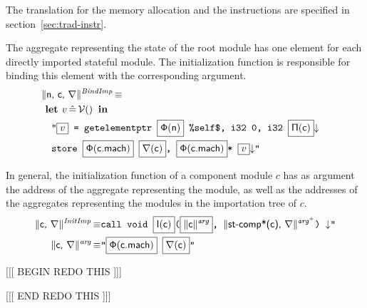 \documentclass{llncs}
\newcommand{\trad}[2]{\ensuremath{\lVert \textsf{#1} \rVert^{\textit{#2}}}}
\newcommand{\nl}[0]{\ensuremath{\downarrow}}
\DeclareMathOperator{\isdef}{\equiv}
\DeclareMathOperator{\variable}{\mathcal{V}()}
\newcommand{\llvm}[1]{\texttt{#1}}
\newcommand{\B}[1]{\textsf{#1}}
\newcommand{\ListOf}[1]{$\mbox{#1}^+$}
\newcommand{\LET}[0]{\textbf{ let }}
\DeclareMathOperator{\BE}{\hat{=}}
\newcommand{\IN}[0]{\textbf{ in }}
\newcommand{\PH}[1]{\framebox{$#1$}}
\newcommand{\idx}[0]{\ensuremath{\sf\Pi}}
\newcommand{\stateref}[0]{\ensuremath{\sf\Phi}}
\newcommand{\self}[0]{\llvm{\%self\$}}
\newcommand{\init}[0]{\ensuremath{\mathsf{I}}}
\begin{document}
The translation for the memory allocation and the instructions are specified in
section~\ref{sec:trad-instr}.  

The aggregate representing the state of the root module has one element for
each directly imported stateful module. The initialization function is
responsible for binding this element with the corresponding argument.
\begin{align*}
  \lefteqn{\trad{\B{n}, \B{c}, \argname}{BindImp} \isdef} \\
  & \LET v \BE \variable \IN \\
  & \quad \llvm{"\PH{v} = getelementptr \PH{\stateref(\B{n})} \self, i32 0, i32 \PH{\idx(\B{c})}\nl}\\
  & \quad \llvm{store \PH{\stateref(\B{c.mach})} \PH{\argname(\B{c})}, 
    \PH{\stateref(\B{c.mach})}* \PH{v}\nl"}
\end{align*}


In general, the initialization function of a component module $c$ has as
argument the address of the aggregate representing the module, as well as the
addresses of the aggregates representing the modules in the importation tree of
$c$.
\begin{align*}
  \trad{\B{c}, \argname}{InitImp} \isdef&
  \llvm{call void \PH{\init(\B{c})}(\PH{\trad{c}{arg}}, \trad{\components(\B{c}), \argname}{\ListOf{arg}}) \nl"} \\
\trad{\B{c}, \argname}{arg} \isdef& 
  \llvm{"\PH{\stateref(\B{c.mach})} \PH{\argname(\B{c})}"}
\end{align*}

\pagebreak

\appendix

[[[ BEGIN REDO THIS ]]]



[[[ END REDO THIS ]]]
\end{document}
